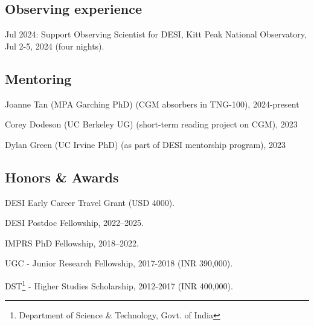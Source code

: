 \documentclass[12pt,letterpaper]{article}
\begin{document}
\subsection{Observing experience}
\begin{list}{}{\cvlist}
\item Jul 2024: Support Observing Scientist for DESI, Kitt Peak National Observatory, Jul 2-5, 2024 (four nights).
\end{list}

\subsection{Mentoring}
\begin{list}{}{\cvlist}
\item Joanne Tan (MPA Garching PhD) (CGM absorbers in TNG-100), 2024-present
\item Corey Dodeson (UC Berkeley UG) (short-term reading project on CGM), 2023
\item Dylan Green (UC Irvine PhD) (as part of DESI mentorship program), 2023
\end{list}

\subsection{Honors \& Awards}
\begin{list}{}{\cvlist}
  \item DESI Early Career Travel Grant (USD 4000).
  \item DESI Postdoc Fellowship, 2022--2025.
  \item IMPRS PhD Fellowship, 2018--2022.
  \item UGC - Junior Research Fellowship, 2017-2018 (INR 390,000).
  \item DST\footnote{Department of Science \& Technology, Govt. of India} - Higher Studies Scholarship, 2012-2017 (INR 400,000).
\end{list}
\end{document}
